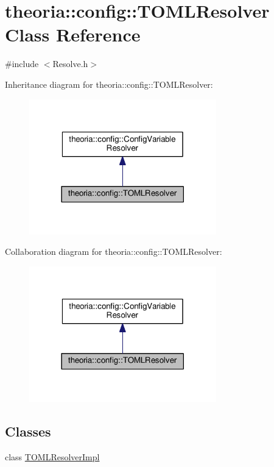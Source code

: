 \hypertarget{classtheoria_1_1config_1_1TOMLResolver}{}\section{theoria\+:\+:config\+:\+:T\+O\+M\+L\+Resolver Class Reference}
\label{classtheoria_1_1config_1_1TOMLResolver}


{\ttfamily \#include $<$Resolve.\+h$>$}



Inheritance diagram for theoria\+:\+:config\+:\+:T\+O\+M\+L\+Resolver\+:\nopagebreak
\begin{figure}[H]
\begin{center}
\leavevmode
\includegraphics[width=230pt]{classtheoria_1_1config_1_1TOMLResolver__inherit__graph}
\end{center}
\end{figure}


Collaboration diagram for theoria\+:\+:config\+:\+:T\+O\+M\+L\+Resolver\+:\nopagebreak
\begin{figure}[H]
\begin{center}
\leavevmode
\includegraphics[width=230pt]{classtheoria_1_1config_1_1TOMLResolver__coll__graph}
\end{center}
\end{figure}
\subsection*{Classes}
\begin{DoxyCompactItemize}
\item 
class \hyperlink{classTOMLResolver_1_1TOMLResolverImpl}{T\+O\+M\+L\+Resolver\+Impl}
\end{DoxyCompactItemize}
